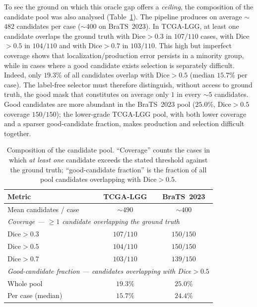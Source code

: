 \documentclass[11pt,a4paper]{article}
\begin{document}
To see the ground on which this oracle gap offers a \emph{ceiling}, the
composition of the candidate pool was also analysed (Table~\ref{tab:pool}). The
pipeline produces on average $\sim$$482$ candidates per case ($\sim$$400$ on
BraTS~2023). In TCGA-LGG, at least one candidate overlaps the ground truth with
Dice$>0.3$ in $107/110$ cases, with Dice$>0.5$ in $104/110$ and with Dice$>0.7$ in
$103/110$. This high but imperfect coverage shows that localization/production
error persists in a minority group, while in cases where a good candidate exists
selection is separately difficult. Indeed, only $19.3\%$ of all candidates overlap
with Dice$>0.5$ (median $15.7\%$ per case). The label-free selector must therefore
distinguish, without access to ground truth, the good mask that constitutes on
average only $1$ in every $\sim$$5$ candidates. Good candidates are more abundant
in the BraTS~2023 pool ($25.0\%$, Dice$>0.5$ coverage $150/150$); the lower-grade
TCGA-LGG pool, with both lower coverage and a sparser good-candidate fraction,
makes production and selection difficult together.

\begin{table}[htpb!]\centering
\caption{Composition of the candidate pool. ``Coverage'' counts the cases in which
\emph{at least one} candidate exceeds the stated threshold against the ground
truth; ``good-candidate fraction'' is the fraction of all pool candidates
overlapping with Dice$>0.5$.}
\label{tab:pool}
\begin{tabular}{lcc}
\toprule
Metric & TCGA-LGG & BraTS~2023 \\
\midrule
Mean candidates / case & $\sim$$490$ & $\sim$$400$ \\
\midrule
\multicolumn{3}{l}{\emph{Coverage --- $\ge 1$ candidate overlapping the ground truth}}\\
\quad Dice$>0.3$ & $107/110$ & $150/150$ \\
\quad Dice$>0.5$ & $104/110$ & $150/150$ \\
\quad Dice$>0.7$ & $103/110$ & $139/150$ \\
\midrule
\multicolumn{3}{l}{\emph{Good-candidate fraction --- candidates overlapping with Dice$>0.5$}}\\
\quad Whole pool & $19.3\%$ & $25.0\%$ \\
\quad Per case (median) & $15.7\%$ & $24.4\%$ \\
\bottomrule
\end{tabular}
\end{table}
\end{document}
